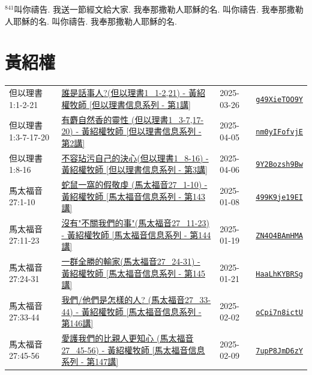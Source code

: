 \documentclass{book}
\begin{document}
$^{841}$叫你禱告.
我送一節經文給大家.
我奉那撒勒人耶穌的名.
叫你禱告.
我奉那撒勒人耶穌的名.
叫你禱告.
我奉那撒勒人耶穌的名.
\newpage



\chapter{黃紹權}\label{ch:preacher18}
\begin{multicols}{3}
\minitoc
\end{multicols}
{ \scriptsize


\begin{xltabular}{\textwidth}{|p{0.15\textwidth} p{0.6\textwidth}|p{0.07\textwidth} p{0.1\textwidth}|}
\hline
但以理書 1:1-2-21 & \hyperref[sec:g49XieTOO9Y]{誰是話事人?(但以理書1\_1-2,21) - 黃紹權牧師  [但以理書信息系列 - 第1講]} & 2025-03-26 & \href{https://youtube.com/watch?v=g49XieTOO9Y}{\texttt{g49XieTOO9Y}} \\
但以理書 1:3-7-17-20 & \hyperref[sec:nm0yIFofvjE]{有麝自然香的靈性 (但以理書1\_3-7,17-20) - 黃紹權牧師  [但以理書信息系列 - 第2講]} & 2025-04-05 & \href{https://youtube.com/watch?v=nm0yIFofvjE}{\texttt{nm0yIFofvjE}} \\
但以理書 1:8-16 & \hyperref[sec:9Y2Bozsh9Bw]{不容玷污自己的決心(但以理書1\_8-16) - 黃紹權牧師  [但以理書信息系列 - 第3講]} & 2025-04-06 & \href{https://youtube.com/watch?v=9Y2Bozsh9Bw}{\texttt{9Y2Bozsh9Bw}} \\
馬太福音 27:1-10 & \hyperref[sec:499K9je19EI]{蛇鼠一窩的假敬虔 (馬太福音27\_1-10) -  黃紹權牧師 [馬太福音信息系列 - 第143講]} & 2025-01-08 & \href{https://youtube.com/watch?v=499K9je19EI}{\texttt{499K9je19EI}} \\
馬太福音 27:11-23 & \hyperref[sec:ZN4O4BAmHMA]{沒有"不關我們的事"(馬太福音27\_11-23) -  黃紹權牧師 [馬太福音信息系列 - 第144講]} & 2025-01-19 & \href{https://youtube.com/watch?v=ZN4O4BAmHMA}{\texttt{ZN4O4BAmHMA}} \\
馬太福音 27:24-31 & \hyperref[sec:HaaLhKYBRSg]{一群全勝的輸家(馬太福音27\_24-31) - 黃紹權牧師  [馬太福音信息系列 - 第145講]} & 2025-01-21 & \href{https://youtube.com/watch?v=HaaLhKYBRSg}{\texttt{HaaLhKYBRSg}} \\
馬太福音 27:33-44 & \hyperref[sec:oCpi7n8ictU]{我們/他們是怎樣的人? (馬太福音27\_33-44) - 黃紹權牧師  [馬太福音信息系列 - 第146講]} & 2025-02-02 & \href{https://youtube.com/watch?v=oCpi7n8ictU}{\texttt{oCpi7n8ictU}} \\
馬太福音 27:45-56 & \hyperref[sec:7upP8JmD6zY]{愛護我們的比親人更知心 (馬太福音27\_45-56) - 黃紹權牧師  [馬太福音信息系列 - 第147講]} & 2025-02-09 & \href{https://youtube.com/watch?v=7upP8JmD6zY}{\texttt{7upP8JmD6zY}} \\

\end{xltabular}}
\end{document}
